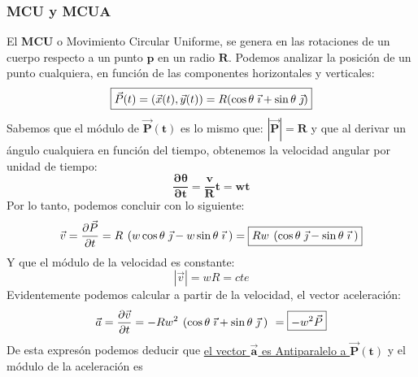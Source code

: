 \subsubsection{MCU y MCUA}
\begin{wrapfigure}{1}{6cm}
        \hspace{0.2cm}
        
        \par
\end{wrapfigure}
 El \textbf{MCU} o Movimiento Circular Uniforme, se genera en las rotaciones de un cuerpo respecto a un punto \(\bm{p}\) en un radio \(\bm{R}\).
Podemos analizar la posición de un punto cualquiera, en función de las componentes horizontales y verticales:
\[
        \boxed{\vec{P}(t)=(\vec{x}(t),\vec{y}(t))=R(\cos{\theta}\hspace{1mm}\vec{\imath} + \sin{\theta}\hspace{1mm}\vec{\jmath})}
\]
Sabemos que el módulo de \(\bm{\vec{P}(t)}\) es lo mismo que: \(\bm{\left | \vec{P} \right | = R}\) y que al derivar un ángulo cualquiera en función del tiempo, obtenemos la velocidad angular por unidad de tiempo:
\[
        \boxed{\bm{\frac{\partial \theta}{\partial t} = \frac{v}{R}t = wt}}
\]
Por lo tanto, podemos concluir con lo siguiente:
\[
        \vec{v} =\frac{\partial \vec{P}}{\partial t} =R \hspace{1.35mm} (w\cos{\theta}\hspace{1mm}\vec{\jmath} - w\sin{\theta}\hspace{1mm}\vec{\imath}\hspace{1mm})  =\boxed{Rw \hspace{1.35mm} (\cos{\theta}\hspace{1mm}\vec{\jmath} - \sin{\theta}\hspace{1mm}\vec{\imath}\hspace{1mm})}
\]
Y que el módulo de la velocidad es constante:
\[
        \left | \vec{v} \right | = wR = cte
\]
Evidentemente podemos calcular a partir de la velocidad, el vector aceleración:
\[
        \vec{a} =\frac{\partial \vec{v}}{\partial t} = -Rw^2 \hspace{1.35mm}(\cos{\theta}\hspace{1mm}\vec{\imath} + \sin{\theta}\hspace{1mm}\vec{\jmath}\hspace{1mm}) \hspace{1.35mm}= \boxed{-w^{2}\vec{P}}
\]
De esta expresón podemos deducir que \underline{el vector \(\bm{\vec{a}}\) es Antiparalelo a \(\bm{\vec{P}(t)}\)} y el módulo de la aceleración es 

